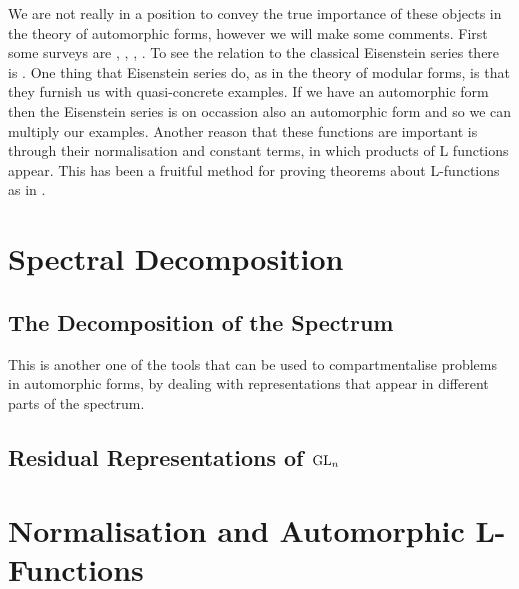 We are not really in a position to convey the true importance of these objects in the theory of automorphic forms, however we will make some comments. First some surveys are \cite{lapidPerspectivesEisensteinSeries2022}, \cite{arthurEisensteinSeriesTrace1979}, \cite{kimEISENSTEINSERIESTHEIR}, \cite{jiangResiduesEisensteinSeries2008a}. To see the relation to the classical Eisenstein series there is \cite{garrettTransitionEisensteinSeries2016}. One thing that Eisenstein series do, as in the theory of modular forms, is that they furnish us with quasi-concrete examples. If we have an automorphic form then the Eisenstein series is on occassion also an automorphic form and so we can multiply our examples. Another reason that these functions are important is through their normalisation and constant terms, in which products of L functions appear. This has been a fruitful method for proving theorems about L-functions as in \cite{shahidiEisensteinSeriesAutomorphic2010}\cite{pollackRANKINSELBERGMETHODUSER}\cite{arthurEisensteinSeriesTrace1979}.

\section{Spectral Decomposition}\label{spectral_decomposition}
\subsection{The Decomposition of the Spectrum}
This is another one of the tools that can be used to compartmentalise problems in automorphic forms, by dealing with representations that appear in different parts of the spectrum. 

\cite{kimEISENSTEINSERIESTHEIR}


\subsection{Residual Representations of \(\operatorname{GL}_n\)}

\section{Normalisation and Automorphic L-Functions}